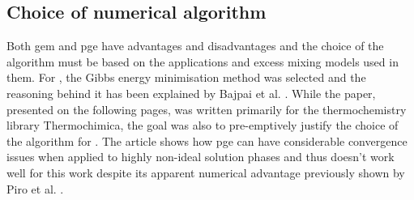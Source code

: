 \subsection{Choice of numerical algorithm}\label{sec:algo_choice}
	Both \gls{gem} and \gls{pge} have advantages and disadvantages and the choice of the algorithm must be based on the applications and excess mixing models used in them. For {\GEM}, the Gibbs energy minimisation method was selected and the reasoning behind it has been explained by Bajpai et al. \cite{Bajpai:2021ab}. While the paper, presented on the following pages, was written primarily for the thermochemistry library Thermochimica, the goal was also to pre-emptively justify the choice of the algorithm for {\GEM}. The article shows how \gls{pge} can have considerable convergence issues when applied to highly non-ideal solution phases and thus doesn't work well for this work despite its apparent numerical advantage previously shown by Piro et al. \cite{Piro13}.
	
	 

